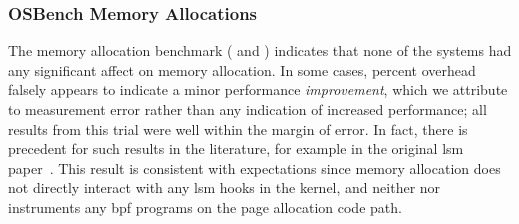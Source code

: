 \subsubsection{OSBench Memory Allocations}

The memory allocation benchmark ( and
) indicates that none of the systems had any significant affect on
memory allocation. In some cases, percent overhead falsely appears to indicate a minor
performance \textit{improvement}, which we attribute to measurement error rather than any
indication of increased performance; all results from this trial were well within the
margin of error. In fact, there is precedent for such results in the literature, for
example in the original \gls{lsm} paper~\cite{wright2002_lsm}. This result is consistent
with expectations since memory allocation does not directly interact with any \gls{lsm}
hooks in the kernel, and neither \bpfbox{} nor \bpfcontain{} instruments any \gls{bpf}
programs on the page allocation code path.





